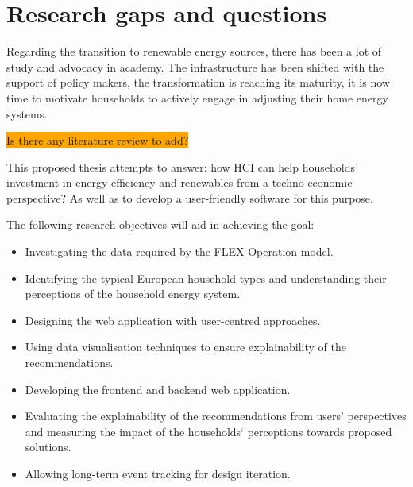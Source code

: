 \section{Research gaps and questions}


Regarding the transition to renewable energy sources, 
there has been a lot of study and advocacy in academy. 
The infrastructure has been shifted with the support of policy makers, 
the transformation is reaching its maturity, 
it is now time to motivate households to actively engage in adjusting their home energy systems.


\colorbox{orange}{Is there any literature review to add?}

This proposed thesis attempts to answer:  
how HCI can help households' investment in energy efficiency and renewables
from a techno-economic perspective? 
As well as to develop a user-friendly software for this purpose. 

The following research objectives will aid in achieving the goal: 

\begin{itemize}
  \item Investigating the data required by the FLEX-Operation model. 
  \item Identifying the typical European household types and understanding their perceptions of the household energy system. 
  \item Designing the web application with user-centred approaches. 
  \item Using data visualisation techniques to ensure explainability of the recommendations. 
  \item Developing the frontend and backend web application. 
  \item Evaluating the explainability of the recommendations from users' perspectives and measuring the impact of the households‘ perceptions towards proposed solutions. 
  \item Allowing long-term event tracking for design iteration. 
\end{itemize}

